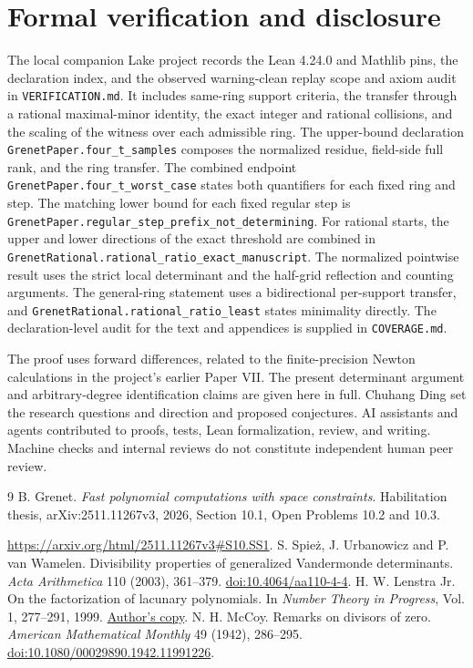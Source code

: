 \documentclass[10pt]{article}
\begin{document}
\clearpage
\section{Formal verification and disclosure}
The local companion Lake project records the Lean 4.24.0 and
Mathlib pins, the declaration index, and the observed warning-clean
replay scope and axiom audit in \texttt{VERIFICATION.md}.
It includes same-ring support criteria, the transfer through a
rational maximal-minor identity, the exact integer and rational
collisions, and the scaling of the witness over each admissible ring.
The upper-bound declaration
\verb|GrenetPaper.four_t_samples| composes the normalized residue,
field-side full rank, and the ring transfer. The combined endpoint
\verb|GrenetPaper.four_t_worst_case| states both quantifiers for
each fixed ring and step. The matching lower
bound for each fixed regular step is
\verb|GrenetPaper.regular_step_prefix_not_determining|.
For rational starts, the upper and lower directions of the exact threshold
are combined in \verb|GrenetRational.rational_ratio_exact_manuscript|.
The normalized pointwise result uses the strict local determinant and
the half-grid reflection and counting arguments. The general-ring
statement uses a bidirectional per-support transfer, and
\verb|GrenetRational.rational_ratio_least| states minimality directly.
The declaration-level audit for the text and appendices is supplied in
\texttt{COVERAGE.md}.

The proof uses forward differences, related to the finite-precision
Newton calculations in the project's earlier Paper VII. The present
determinant argument and arbitrary-degree identification claims are
given here in full. Chuhang Ding set the research questions and direction and proposed conjectures. AI assistants and agents contributed to proofs, tests, Lean formalization, review, and writing. Machine checks and internal reviews do not constitute independent human peer review.

\begin{thebibliography}{9}
 B. Grenet. \emph{Fast polynomial computations with space
constraints}. Habilitation thesis, arXiv:2511.11267v3, 2026,
Section 10.1, Open Problems 10.2 and 10.3.\par\url{https://arxiv.org/html/2511.11267v3#S10.SS1}.
 S. Spie\.z, J. Urbanowicz and P. van Wamelen.
Divisibility properties of generalized Vandermonde determinants.
\emph{Acta Arithmetica} 110 (2003), 361--379.
\href{https://doi.org/10.4064/aa110-4-4}{doi:10.4064/aa110-4-4}.
 H. W. Lenstra Jr. On the factorization of lacunary
polynomials. In \emph{Number Theory in Progress}, Vol. 1, 277--291, 1999.
\href{https://pub.math.leidenuniv.nl/~lenstrahw/PUBLICATIONS/1999b/art.pdf}{Author's copy}.
 N. H. McCoy. Remarks on divisors of zero.
\emph{American Mathematical Monthly} 49 (1942), 286--295.
\href{https://doi.org/10.1080/00029890.1942.11991226}{doi:10.1080/00029890.1942.11991226}.
\end{thebibliography}
\end{document}
